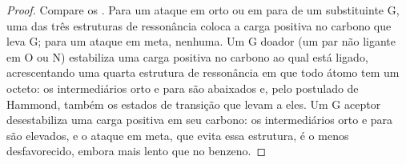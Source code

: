 \begin{proof}
Compare os . Para um ataque em orto ou em para de um
substituinte G, uma das três estruturas de ressonância coloca a carga positiva
no carbono que leva G; para um ataque em meta, nenhuma. Um G doador (um par não
ligante em O ou N) estabiliza uma carga positiva no carbono ao qual está
ligado, acrescentando uma quarta estrutura de ressonância em que todo átomo
tem um octeto: os intermediários orto e para são abaixados e, pelo postulado
de Hammond, também os estados de transição que levam a eles. Um G aceptor
desestabiliza uma carga positiva em seu carbono: os intermediários orto e para
são elevados, e o ataque em meta, que evita essa estrutura, é o menos
desfavorecido, embora mais lento que no benzeno.
\end{proof}

